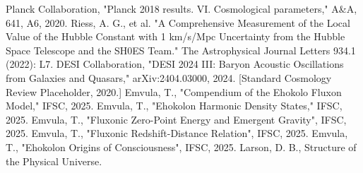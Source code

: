 \documentclass[11pt]{article}
\begin{document}

\begin{thebibliography}{99} %

     Planck Collaboration, "Planck 2018 results. VI. Cosmological parameters," A\&A, 641, A6, 2020.
     Riess, A. G., et al. "A Comprehensive Measurement of the Local Value of the Hubble Constant with 1 km/s/Mpc Uncertainty from the Hubble Space Telescope and the SH0ES Team." The Astrophysical Journal Letters 934.1 (2022): L7.
     DESI Collaboration, "DESI 2024 III: Baryon Acoustic Oscillations from Galaxies and Quasars," arXiv:2404.03000, 2024.
      [Standard Cosmology Review Placeholder, 2020.]
     Emvula, T., "Compendium of the Ehokolo Fluxon Model," IFSC, 2025.
     Emvula, T., "Ehokolon Harmonic Density States," IFSC, 2025.
     Emvula, T., "Fluxonic Zero-Point Energy and Emergent Gravity", IFSC, 2025.
     Emvula, T., "Fluxonic Redshift-Distance Relation", IFSC, 2025.
     Emvula, T., "Ehokolon Origins of Consciousness", IFSC, 2025.
     Larson, D. B., Structure of the Physical Universe.

\end{thebibliography}
\end{document}
